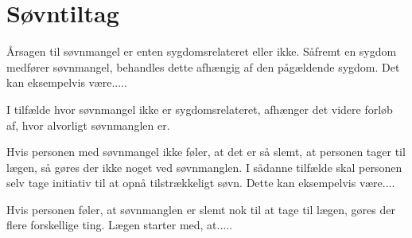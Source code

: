 \section{Søvntiltag}




Årsagen til søvnmangel er enten sygdomsrelateret eller ikke. Såfremt en sygdom medfører søvnmangel, behandles dette afhængig af den pågældende sygdom. Det kan eksempelvis være.....

I tilfælde hvor søvnmangel ikke er sygdomsrelateret, afhænger det videre forløb af, hvor alvorligt søvnmanglen er. 

Hvis personen med søvnmangel ikke føler, at det er så slemt, at personen tager til lægen, så gøres der ikke noget ved søvnmanglen. I sådanne tilfælde skal personen selv tage initiativ til at opnå tilstrækkeligt søvn. Dette kan eksempelvis være....

Hvis personen føler, at søvnmanglen er slemt nok til at tage til lægen, gøres der flere forskellige ting. Lægen starter med, at.....